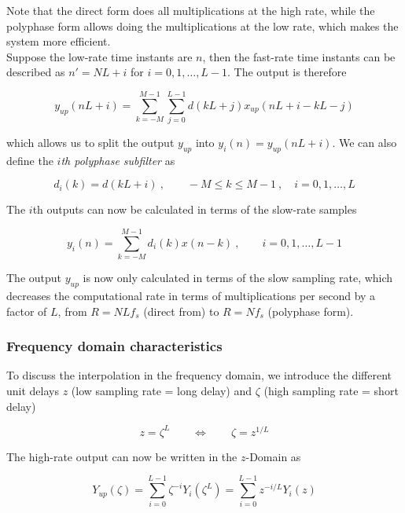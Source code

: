 Note that the direct form does all multiplications at the high rate, while
the polyphase form allows doing the multiplications at the low rate, which
makes the system more efficient. \\

Suppose the low-rate time instants are $n$, then the fast-rate time instants
can be described as $n' = NL+i$ for $i=0,1,\ldots,L-1$. The output is therefore

\begin{equation*}
	y_{up}(nL+i) = \sum\limits_{k=-M}^{M-1}\sum\limits_{j=0}^{L-1} d(kL+j) x_{up}(nL+i-kL-j)
\end{equation*}

which allows us to split the output $y_{up}$ into $y_i(n)=y_{up}(nL+i)$.
We can also define the \emph{$i$th polyphase subfilter} as

\begin{equation*}
	d_i(k) = d(kL+i) \:,\qquad -M \leq k \leq M-1 \:,\quad i=0,1,\ldots,L
\end{equation*}

The $i$th outputs can now be calculated in terms of the slow-rate samples

\begin{equation*}
	y_i(n) = \sum\limits_{k=-M}^{M-1}d_i(k) x(n-k) \:,\qquad i=0,1,\ldots,L-1
\end{equation*}

The output $y_{up}$ is now only calculated in terms of the slow sampling rate,
which decreases the computational rate in terms of multiplications per second by
a factor of $L$, from $R = NLf_s$ (direct from) to $R = Nf_s$ (polyphase form).


\subsubsection{Frequency domain characteristics}
To discuss the interpolation in the frequency domain, we introduce the different
unit delays $z$ (low sampling rate = long delay) and $\zeta$
(high sampling rate = short delay)

\begin{equation*}
	z = \zeta^L \qquad \Leftrightarrow \qquad \zeta = z^{1/L}
\end{equation*}

The high-rate output can now be written in the $z$-Domain as

\begin{equation*}
	Y_{up}(\zeta) = \sum\limits_{i=0}^{L-1} \zeta^{-i} Y_i(\zeta^L)
	= \sum\limits_{i=0}^{L-1} z^{-i/L} Y_i(z)
\end{equation*}

